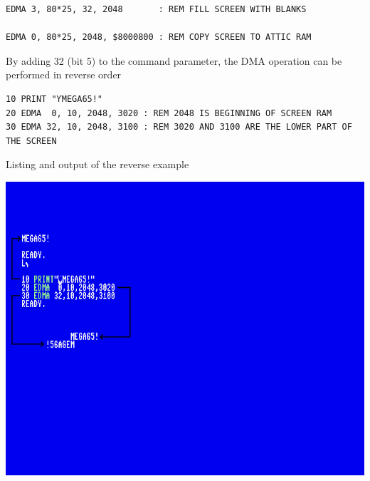 \begin{description}[leftmargin=2cm,style=nextline]
\begin{tcolorbox}[colback=black,coltext=white]
\begin{verbatim}
EDMA 3, 80*25, 32, 2048       : REM FILL SCREEN WITH BLANKS

EDMA 0, 80*25, 2048, $8000800 : REM COPY SCREEN TO ATTIC RAM
\end{verbatim}
\end{tcolorbox}

                  By adding 32 (bit 5) to the command parameter, the DMA operation can be performed in reverse order

\begin{tcolorbox}[colback=black,coltext=white]
\verbatimfont{\codefont}
\begin{verbatim}
10 PRINT "ƳMEGA65!"
20 EDMA  0, 10, 2048, 3020 : REM 2048 IS BEGINNING OF SCREEN RAM
30 EDMA 32, 10, 2048, 3100 : REM 3020 AND 3100 ARE THE LOWER PART OF THE SCREEN
\end{verbatim}
\end{tcolorbox}
\clearpage

                  Listing and output of the reverse example

\item \begin{center}\includegraphics[width=\linewidth]{images/basic-example-edma.png}\end{center}
\end{description}


\newpage
